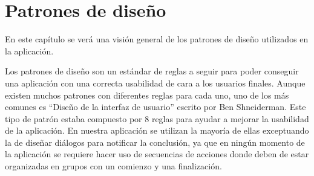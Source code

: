 \chapter{Patrones de diseño}
\label{cap:patronesDeDiseño}



\begin{resumen}
	En este capítulo se verá una visión general de los patrones de diseño utilizados en la aplicación.
\end{resumen}


Los patrones de diseño son un estándar de reglas a seguir para poder conseguir una aplicación con una correcta usabilidad de cara a los usuarios finales. Aunque existen muchos patrones con diferentes reglas para cada uno, uno de los más comunes es “Diseño de la interfaz de usuario” escrito por Ben Shneiderman. Este tipo de patrón estaba compuesto por 8 reglas para ayudar a mejorar la usabilidad de la aplicación.
En nuestra aplicación se utilizan la mayoría de ellas exceptuando la de diseñar diálogos para notificar la conclusión, ya que en ningún momento de la aplicación se requiere hacer uso de secuencias de acciones donde deben de estar organizadas en grupos con un comienzo y una finalización.
